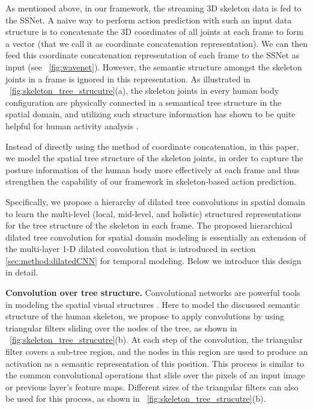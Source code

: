 \documentclass[10pt,twocolumn,letterpaper]{article}
\begin{document}
As mentioned above, in our framework,
the streaming 3D skeleton data is fed to the SSNet.
A naive way to perform action prediction with such an input data structure
is to concatenate the 3D coordinates of all joints at each frame to form a vector
(that we call it as coordinate concatenation representation).
We can then feed this coordinate concatenation representation of each frame to the SSNet as input (see \figurename{~\ref{fig:wavenet}}).
However, the semantic structure amongst the skeleton joints in a frame is ignored in this representation.
As illustrated in \figurename{~\ref{fig:skeleton_tree_strucutre}(a)},
the skeleton joints in every human body configuration are physically connected in a semantical tree structure in the spatial domain,
and utilizing such structure information has shown to be quite helpful for human activity analysis \cite{du2015hierarchical,liu2016eccv, shahroudy2016multimodal}.

Instead of directly using the method of coordinate concatenation,
in this paper,
we model the spatial tree structure of the skeleton joints,
in order to capture the posture information of the human body more effectively at each frame
and thus strengthen the capability of our framework in skeleton-based action prediction.

Specifically, we propose a hierarchy of dilated tree convolutions in spatial domain to learn the multi-level (local, mid-level, and holistic) structured representations for the tree structure of the skeleton in each frame.
The proposed hierarchical dilated tree convolution for spatial domain modeling is essentially
an extension of the multi-layer 1-D dilated convolution that is introduced in section \ref{sec:method:dilatedCNN} for temporal modeling.
Below we introduce this design in detail.









\textbf{Convolution over tree structure.}
Convolutional networks are powerful tools in modeling the spatial visual structures \cite{lecun1995convolutional}.
Here to model the discussed semantic structure of the human skeleton,
we propose to apply convolutions by using triangular filters sliding over the nodes of the tree, as shown in \figurename{~\ref{fig:skeleton_tree_strucutre}(b)}.
At each step of the convolution, the triangular filter covers a sub-tree region,
and the nodes in this region are used to produce an activation as a semantic representation of this position.
This process is similar to the common convolutional operations that slide over the pixels of an input image or previous layer's feature maps.
Different sizes of the triangular filters can also be used for this process,
as shown in \figurename{~\ref{fig:skeleton_tree_strucutre}}(b).
\end{document}
